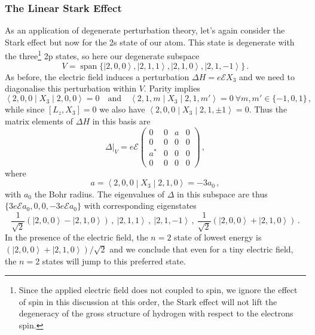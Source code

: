 \documentclass{article}
\theoremstyle{plain}\theoremheaderfont{\normalfont\itshape}\theorembodyfont{\rmfamily}\theoremseparator{.}\newtheorem*{rem}{Remark}\newtheorem*{ex}{Example}\newtheorem*{proof}{Proof}\newtheorem*{altp}{Alternative proof}
\theoremstyle{plain}\theoremheaderfont{\normalfont\bfseries}\theorembodyfont{\rmfamily}\theoremseparator{.}\newtheorem{thm}{Theorem}[section]\newtheorem{lem}[thm]{Lemma}\newtheorem{prop}[thm]{Proposition}\newtheorem*{cor}{Corollary}\newtheorem{defn}[thm]{Definition}\newtheorem{clm}[thm]{Claim}\newtheorem{clminproof}{Claim}
\theoremstyle{break}\theoremheaderfont{\normalfont\itshape}\theorembodyfont{\rmfamily}\theoremseparator{.\medskip}\newtheorem*{proofskip}{Proof}\newtheorem*{exs}{Examples}\newtheorem*{rems}{Remarks}
\theoremstyle{break}\theoremheaderfont{\normalfont\bfseries}\theorembodyfont{\rmfamily}\theoremseparator{.\medskip}\newtheorem{lemskip}[thm]{Lemma}\newtheorem{defnskip}[thm]{Definition}\newtheorem{propskip}[thm]{Proposition}\newtheorem{thmskip}[thm]{Theorem}
\numberwithin{equation}{section}
\newcommand{\ket}[1]{\left| #1 \right\rangle}
\newcommand{\mel}[3]{\left\langle #1 \middle| #2 \middle| #3 \right\rangle}
\newcommand{\expval}[2]{\left\langle #2 \middle| #1 \middle| #2 \right\rangle}
\DeclareMathOperator{\spn}{span}
\begin{document}
    \subsubsection{The Linear Stark Effect}
    As an application of degenerate perturbation theory, let's again consider the Stark effect but now for the 2s state of our atom. This state is degenerate with the three\footnote{Since the applied electric field does not coupled to spin, we ignore the effect of spin in this discussion at this order, the Stark effect will not lift the degeneracy of the gross structure of hydrogen with respect to the electrons spin.} 2p states, so here our degenerate subspace
    \begin{equation}
        V=\spn\{\ket{2,0,0},\ket{2,1,1},\ket{2,1,0},\ket{2,1,-1}\}\,.
    \end{equation}
    As before, the electric field induces a perturbation \(\Delta H=e\mathcal{E}X_3\) and we need to diagonalise this perturbation within \(V\). Parity implies
    \begin{equation}
        \expval{X_3}{2,0,0}=0\quad\text{and}\quad\mel{2,1,m}{X_3}{2,1,m'}=0\ \forall m,m'\in\{-1,0,1\}\,,
    \end{equation}
    while since \([L_z,X_3]=0\) we also have \(\mel{2,0,0}{X_3}{2,1,\pm 1}=0\). Thus the matrix elements of \(\Delta H\) in this basis are
    \begin{equation}
        \Delta|_V=e\mathcal{E}\begin{pmatrix}
            0 & 0 & a & 0\\
            0 & 0 & 0 & 0\\
            a^* & 0 & 0 & 0\\
            0 & 0 & 0 & 0
        \end{pmatrix}\,,
    \end{equation}
    where
    \begin{equation}
        a=\mel{2,0,0}{X_3}{2,1,0}=-3a_0\,,
    \end{equation}
    with \(a_0\) the Bohr radius. The eigenvalues of \(\Delta\) in this subspace are thus \(\{3e\mathcal{E}a_0,0,0,-3e\mathcal{E}a_0\}\) with corresponding eigenstates
    \begin{equation}
        \frac{1}{\sqrt{2}}(\ket{2,0,0}-\ket{2,1,0})\,,\ \ket{2,1,1}\,,\ \ket{2,1,-1}\,,\ \frac{1}{\sqrt{2}}(\ket{2,0,0}+\ket{2,1,0})\,.
    \end{equation}
    In the presence of the electric field, the \(n=2\) state of lowest energy is \((\ket{2,0,0}+\ket{2,1,0})/\sqrt{2}\) and we conclude that even for a tiny electric field, the \(n=2\) states will jump to this preferred state.
\end{document}
